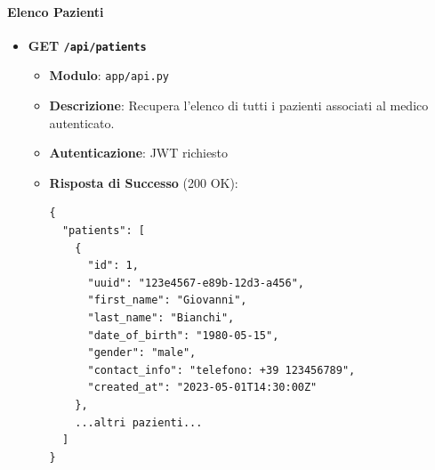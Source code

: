 \documentclass[12pt,a4paper,oneside]{report}
\begin{document}
\paragraph{Elenco Pazienti}
\begin{itemize}
    \item \textbf{GET \texttt{/api/patients}}
          \begin{itemize}
              \item \textbf{Modulo}: \texttt{app/api.py}
              \item \textbf{Descrizione}: Recupera l'elenco di tutti i pazienti associati al medico autenticato.
              \item \textbf{Autenticazione}: JWT richiesto
              \item \textbf{Risposta di Successo} (200 OK):
                    \begin{verbatim}
{
  "patients": [
    {
      "id": 1,
      "uuid": "123e4567-e89b-12d3-a456",
      "first_name": "Giovanni",
      "last_name": "Bianchi",
      "date_of_birth": "1980-05-15",
      "gender": "male",
      "contact_info": "telefono: +39 123456789",
      "created_at": "2023-05-01T14:30:00Z"
    },
    ...altri pazienti...
  ]
}
        \end{verbatim}
          \end{itemize}
\end{itemize}
\end{document}
